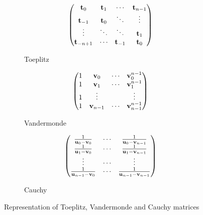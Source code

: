 \begin{figure}[htb]
   \centering
   \begin{subfigure}[b]{0.32\textwidth}
       \centering
       \begin{equation*}
	  \begin{pmatrix}
	    \mathbf{t}_0      & \mathbf{t}_1 & \cdots     & \mathbf{t}_{n-1} \\
	    \mathbf{t}_{-1}   & \mathbf{t}_0 & \ddots     & \vdots      \\
	    \vdots       & \ddots  & \ddots     & \mathbf{t}_1     \\
	    \mathbf{t}_{-n+1} & \cdots  & \mathbf{t}_{-1} & \mathbf{t}_0
	  \end{pmatrix}
       \end{equation*}
       \caption*{Toeplitz}
   \end{subfigure}
   \hfill
   \begin{subfigure}[b]{0.32\textwidth}
       \centering
       \begin{equation*}
	  \begin{pmatrix}
	    1 & \mathbf{v}_0     & \cdots & \mathbf{v}_0^{n-1} \\
	    1 & \mathbf{v}_1     & \cdots & \mathbf{v}_1^{n-1} \\
	    1 & \vdots      &        & \vdots        \\
	    1 & \mathbf{v}_{n-1} & \cdots & \mathbf{v}_{n-1}^{n-1}
	  \end{pmatrix}
       \end{equation*}
       \caption*{Vandermonde}
   \end{subfigure}
   \hfill
   \begin{subfigure}[b]{0.32\textwidth}
       \centering
       \begin{equation*}
	  \begin{pmatrix}
	  \frac{1}{\mathbf{u}_0 - \mathbf{v}_{0}}     & \cdots & \frac{1}{\mathbf{u}_0 - \mathbf{v}_{n-1}} \\
	  \frac{1}{\mathbf{u}_1 - \mathbf{v}_{0}}     & \cdots & \frac{1}{\mathbf{u}_1 - \mathbf{v}_{n-1}} \\
	  \vdots                            & \cdots & \vdots                          \\
	  \frac{1}{\mathbf{u}_{n-1} - \mathbf{v}_{0}} & \cdots & \frac{1}{\mathbf{u}_{n-1} - \mathbf{v}_{n-1}}
	  \end{pmatrix}
       \end{equation*}
       \caption*{Cauchy}
   \end{subfigure}
   \caption{Representation of Toeplitz, Vandermonde and Cauchy matrices}
  \label{figure:ch3-example_structure_matrices}
\end{figure}



